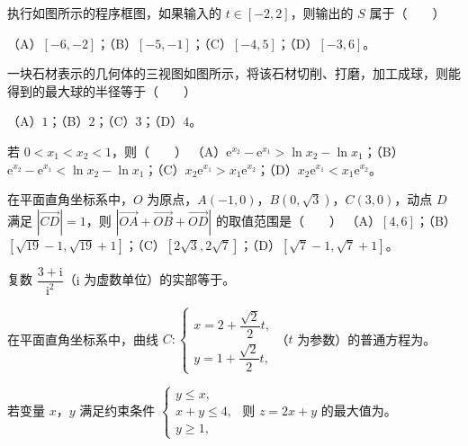 \begin{question}
执行如图所示的程序框图，如果输入的 $t\in[-2,2]$，则输出的 $S$ 属于\mbox{（　　）}
\nopagebreak[4]
\begin{center}\end{center}
\nopagebreak[4]
（A）$[-6,-2]$；（B）$[-5,-1]$；（C）$[-4,5]$；（D）$[-3,6]$。
\Needspace{0.4\textheight}
\end{question}
\begin{question}
一块石材表示的几何体的三视图如图所示，将该石材切削、打磨，加工成球，则能得到的最大球的半径等于\mbox{（　　）}
\nopagebreak[4]
\begin{center}\end{center}
\nopagebreak[4]
（A）$1$；（B）$2$；（C）$3$；（D）$4$。
\end{question}
\begin{question}
若 $0<x_1<x_2<1$，则\mbox{（　　）}
（A）$\mathrm e^{x_2}-\mathrm e^{x_1}>\ln x_2-\ln x_1$；（B）$\mathrm e^{x_2}-\mathrm e^{x_1}<\ln x_2-\ln x_1$；（C）$x_2\mathrm e^{x_1}>x_1\mathrm e^{x_2}$；（D）$x_2\mathrm e^{x_1}<x_1\mathrm e^{x_2}$。
\end{question}
\begin{question}
在平面直角坐标系中，$O$ 为原点，$A(-1,0)$，$B(0,\sqrt3)$，$C(3,0)$，动点 $D$ 满足 $|\overrightarrow{CD}|=1$，则 $|\overrightarrow{OA}+\overrightarrow{OB}+\overrightarrow{OD}|$ 的取值范围是\mbox{（　　）}
（A）$[4,6]$；（B）$[\sqrt{19}-1,\sqrt{19}+1]$；（C）$[2\sqrt3,2\sqrt7]$；（D）$[\sqrt7-1,\sqrt7+1]$。
\end{question}
\begin{question}
复数 $\dfrac{3+\mathrm i}{\mathrm i^2}$（$\mathrm i$ 为虚数单位）的实部等于\gkblank{}。
\end{question}
\begin{question}
在平面直角坐标系中，曲线 $C:\begin{cases}x=2+\dfrac{\sqrt2}2t,\\y=1+\dfrac{\sqrt2}2t,\end{cases}$（$t$ 为参数）的普通方程为\gkblank{}。
\end{question}
\begin{question}
若变量 $x$，$y$ 满足约束条件 $\begin{cases}y\leqslant x,\\x+y\leqslant4,\\y\geqslant1,\end{cases}$ 则 $z=2x+y$ 的最大值为\gkblank{}。
\end{question}
